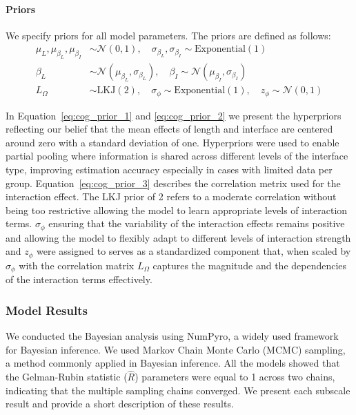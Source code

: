 \paragraph{Priors}
We specify priors for all model parameters. The priors are defined as follows:
\begin{align}
    \mu_{L}, \mu_{\beta_L}, \mu_{\beta_I} &\sim \mathcal{N}(0, 1), \quad \sigma_{\beta_L}, \sigma_{\beta_I} \sim \text{Exponential}(1) \label{eq:cog_prior_1} \\
    \beta_L &\sim \mathcal{N}(\mu_{\beta_L}, \sigma_{\beta_L}), \quad \beta_I \sim \mathcal{N}(\mu_{\beta_I}, \sigma_{\beta_I}) \label{eq:cog_prior_2} \\
    L_{\Omega} &\sim \text{LKJ}(2), \quad \sigma_{\phi} \sim \text{Exponential}(1), \quad z_{\phi} \sim \mathcal{N}(0, 1) \label{eq:cog_prior_3} 
\end{align}

In Equation~\ref{eq:cog_prior_1} and \ref{eq:cog_prior_2} we present the hyperpriors reflecting our belief that the mean effects of length and interface are centered around zero with a standard deviation of one. Hyperpriors were used to enable partial pooling where information is shared across different levels of the interface type, improving estimation accuracy especially in cases with limited data per group. Equation~\ref{eq:cog_prior_3} describes the correlation metrix used for the interaction effect. The LKJ prior of 2 refers to a moderate correlation without being too restrictive allowing the model to learn appropriate levels of interaction terms. $\sigma_{\phi}$ ensuring that the variability of the interaction effects remains positive and allowing the model to flexibly adapt to different levels of interaction strength and $z_{\phi}$ were assigned to serves as a standardized component that, when scaled by $\sigma_{\phi}$ with the correlation matrix $L_{\Omega}$ captures the magnitude and the dependencies of the interaction terms effectively.


\subsubsection{Model Results}
We conducted the Bayesian analysis using NumPyro, a widely used framework for Bayesian inference. We used Markov Chain Monte Carlo (MCMC) sampling, a method commonly applied in Bayesian inference. All the models showed that the Gelman-Rubin statistic ($\hat{R}$) parameters were equal to 1 across two chains, indicating that the multiple sampling chains converged. We present each subscale result and provide a short description of these results.

